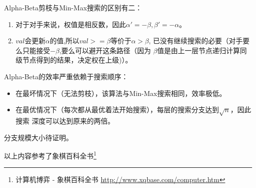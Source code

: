 Alpha-Beta剪枝与Min-Max搜索的区别有二：

\begin{enumerate}
    \item 对于对手来说，权值是相反数，因此$\alpha'=-\beta,\beta'=-\alpha$。
    \item $val$会更新$\alpha$的值,所以$val>=\beta$等价于$\alpha>\beta$,
    已没有继续搜索的必要（对手要么只能接受$-\beta$,要么可以避开这条路径（因为
    $\beta$值是由上一层节点递归计算同级节点得到的结果，决定权在上级)）。
\end{enumerate}

Alpha-Beta的效率严重依赖于搜索顺序：

\begin{itemize}
	\item 在最坏情况下（无法剪枝），该算法与Min-Max搜索相同，效率极低。
	\item 在最优情况下（每次都从最优着法开始搜索），每层的搜索分支达到$\sqrt{n}$，因此搜索
	      深度可以达到原来的两倍。
\end{itemize}

分支规模大小待证明。

以上内容参考了象棋百科全书\footnote{计算机博弈 - 象棋百科全书
	\url{http://www.xqbase.com/computer.htm}}
